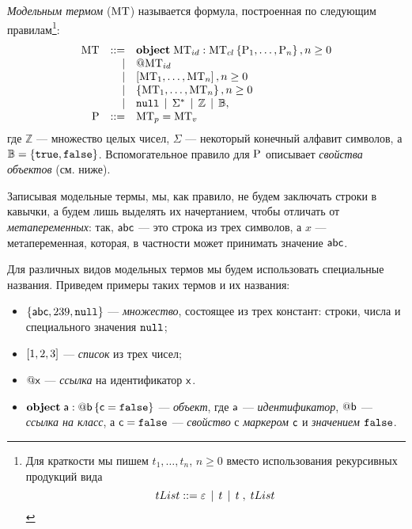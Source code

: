 \begin{Def}\label{defmt}
\emph{Модельным термом} ($\mbox{MT}$) называется формула, построенная по следующим правилам\footnote{
Для краткости мы пишем $t_1, \ldots, t_n$, $n \ge 0$ вместо использования рекурсивных продукций вида $$tList ::= \varepsilon \;\,|\;\, t \;\,|\;\, t \;,\; tList$$
}:
\[
\begin{array}{rrl}
	\mbox{MT} & ::= & \mathbf{object}\;\mbox{MT}_{id} : \mbox{MT}_{cl}\left\{ \mbox{P}_1,\ldots,\mbox{P}_n \right\}, n \ge 0 \\ 
	           &   | & @\mbox{MT}_{id} \\ 
	           &   | & \left[\mbox{MT}_1,\ldots,\mbox{MT}_n\right], n \ge 0 \\ 
	           &   | & \left\{\mbox{MT}_1,\ldots,\mbox{MT}_n\right\}, n \ge 0 \\ 
	           &   | & \mathtt{null} \;\,|\;\, \Sigma^* \;\,|\;\, \mathbb{Z} \;\,|\;\, \mathbb{B}, \\
	\mbox{P} & ::= & \mbox{MT}_{p}=\mbox{MT}_{v}\\
\end{array}
\]
где $\mathbb{Z}$ --- множество целых чисел, $\Sigma$ --- некоторый конечный алфавит символов, а $\mathbb{B} = \left\{ \mathtt{true}, \mathtt{false} \right\}$. Вспомогательное правило для $\mbox{P}$ описывает \emph{свойства объектов} (см. ниже).
\end{Def}

Записывая модельные термы, мы, как правило, не будем заключать строки в кавычки, а будем лишь выделять их начертанием, чтобы отличать от \emph{метапеременных}: так, $\mathsf{abc}$ --- это строка из трех символов, а $x$ --- метапеременная, которая, в частности может принимать значение $\mathsf{abc}$.

Для различных видов модельных термов мы будем использовать специальные названия. Приведем примеры таких термов и их названия:
\begin{itemize}
\item $\left\{\mathsf{abc}, 239, \mathtt{null}\right\}$ --- \emph{множество}, состоящее из трех констант: строки, числа и специального значения $\mathtt{null}$;
\item $\left[1, 2, 3\right]$ --- \emph{список} из трех чисел;
\item $@\mathsf{x}$ --- \emph{ссылка} на идентификатор $\mathsf{x}$.
\item $\mathbf{object}\;\mathsf{a} : @\mathsf{b}\left\{ \mathsf{c}=\mathtt{false} \right\}$ --- \emph{объект}, где $\mathsf{a}$ --- \emph{идентификатор}, $@\mathsf{b}$ --- \emph{ссылка на класс}, а $\mathsf{c} = \mathtt{false}$ --- \emph{свойство} с \emph{маркером} $\mathsf{c}$ и  \emph{значением} $\mathtt{false}$.
\end{itemize}

